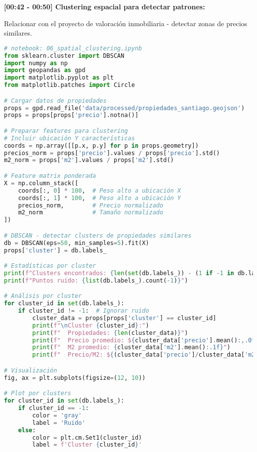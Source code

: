 \documentclass[11pt,a4paper]{article}
\begin{document}
\textbf{[00:42 - 00:50] Clustering espacial para detectar patrones:}

\begin{tipbox}
Relacionar con el proyecto de valoración inmobiliaria - detectar zonas de precios similares.
\end{tipbox}

\begin{lstlisting}[language=Python]
# notebook: 06_spatial_clustering.ipynb
from sklearn.cluster import DBSCAN
import numpy as np
import geopandas as gpd
import matplotlib.pyplot as plt
from matplotlib.patches import Circle

# Cargar datos de propiedades
props = gpd.read_file('data/processed/propiedades_santiago.geojson')
props = props[props['precio'].notna()]

# Preparar features para clustering
# Incluir ubicación Y características
coords = np.array([[p.x, p.y] for p in props.geometry])
precios_norm = props['precio'].values / props['precio'].std()
m2_norm = props['m2'].values / props['m2'].std()

# Feature matrix ponderada
X = np.column_stack([
    coords[:, 0] * 100,  # Peso alto a ubicación X
    coords[:, 1] * 100,  # Peso alto a ubicación Y  
    precios_norm,        # Precio normalizado
    m2_norm              # Tamaño normalizado
])

# DBSCAN - detectar clusters de propiedades similares
db = DBSCAN(eps=50, min_samples=5).fit(X)
props['cluster'] = db.labels_

# Estadísticas por cluster
print(f"Clusters encontrados: {len(set(db.labels_)) - (1 if -1 in db.labels_ else 0)}")
print(f"Puntos ruido: {list(db.labels_).count(-1)}")

# Análisis por cluster
for cluster_id in set(db.labels_):
    if cluster_id != -1:  # Ignorar ruido
        cluster_data = props[props['cluster'] == cluster_id]
        print(f"\nCluster {cluster_id}:")
        print(f"  Propiedades: {len(cluster_data)}")
        print(f"  Precio promedio: ${cluster_data['precio'].mean():,.0f}")
        print(f"  M2 promedio: {cluster_data['m2'].mean():.1f}")
        print(f"  Precio/M2: ${(cluster_data['precio']/cluster_data['m2']).mean():,.0f}")

# Visualización
fig, ax = plt.subplots(figsize=(12, 10))

# Plot por clusters
for cluster_id in set(db.labels_):
    if cluster_id == -1:
        color = 'gray'
        label = 'Ruido'
    else:
        color = plt.cm.Set1(cluster_id)
        label = f'Cluster {cluster_id}'
    

\end{lstlisting}
\end{document}
